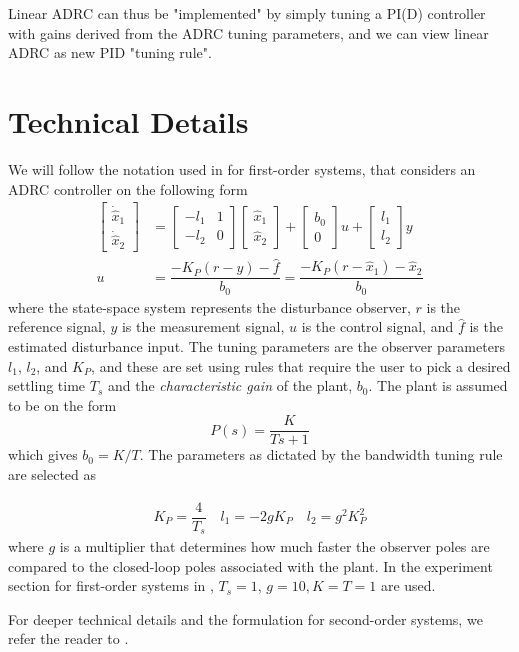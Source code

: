 \documentclass[letterpaper, 10 pt, conference]{ieeeconf}
\newcommand{\bmatrixx}[1]{\begin{bmatrix}#1\end{bmatrix}}
\begin{document}
Linear ADRC can thus be "implemented" by simply tuning a PI(D) controller with gains derived from the ADRC tuning parameters, and we can view linear ADRC as new PID "tuning rule".

\section{Technical Details}
We will follow the notation used in \cite{herbst2013simulative} for first-order systems, that considers an ADRC controller on the following form
\begin{align}
   \bmatrixx{\dot{\hat{x}}_1 \\ \dot{\hat{x}}_2} &= 
   		\bmatrixx{-l_1 & 1 \\ -l_2 & 0} \bmatrixx{\hat{x}_1 \\ \hat{x}_2} + 
		\bmatrixx{b_0 \\ 0} u + \bmatrixx{l_1 \\ l_2} y \\
	u &= \dfrac{-K_P(r-y) - \hat{f}}{b_0} = \dfrac{-K_P(r-\hat{x}_1) - \hat{x}_2}{b_0}
\end{align}
where the state-space system represents the disturbance observer, $r$ is the reference signal, $y$ is the measurement signal, $u$ is the control signal, and $\hat{f}$ is the estimated disturbance input. The tuning parameters are the observer parameters $l_1$, $l_2$, and $K_P$, and these are set using rules that require the user to pick a desired settling time $T_s$ and the \emph{characteristic gain} of the plant, $b_0$. The plant is assumed to be on the form
$$P(s) = \dfrac{K}{Ts+1}$$
which gives $b_0 = K/T$. The parameters as dictated by the bandwidth tuning rule are selected as 


\begin{align}
	K_P = \dfrac{4}{T_s} \quad  l_1 = -2gK_P \quad	l_2 = g^2K_P^2
\end{align}
where $g$ is a multiplier that determines how much faster the observer poles are compared to the closed-loop poles associated with the plant. In the experiment section for first-order systems in \cite{herbst2013simulative}, $T_s = 1$, $g = 10, K = T = 1$ are used.

For deeper technical details and the formulation for second-order systems, we refer the reader to \cite{herbst2013simulative}.
\end{document}
